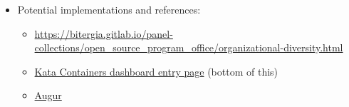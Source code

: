 \begin{itemize}
\tightlist
\item
  Potential implementations and references:

  \begin{itemize}
  \tightlist
  \item
    \href{https://bitergia.gitlab.io/panel-collections/open_source_program_office/organizational-diversity.html}{\url{https://bitergia.gitlab.io/panel-collections/open_source_program_office/organizational-diversity.html}}
  \item
    \href{https://katacontainers.biterg.io}{Kata Containers dashboard
    entry page} (bottom of this)
  \item
    \href{https://github.com/chaoss/augur}{Augur}
  \end{itemize}
\end{itemize}
